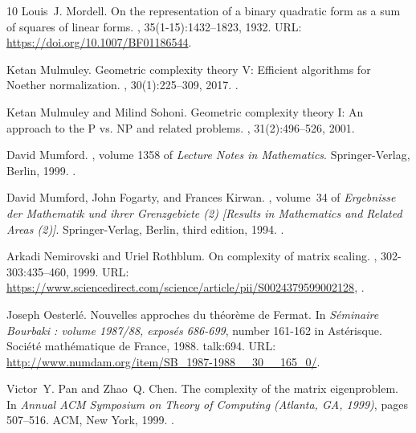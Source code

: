 \documentclass[10pt,a4paper]{article}
\theoremstyle{definition}
\numberwithin{equation}{section}
\begin{document}
\begin{thebibliography}{10}
Louis~J. Mordell.
\newblock On the representation of a binary quadratic form as a sum of squares
  of linear forms.
, 35(1-15):1432--1823, 1932.
\newblock URL: \url{https://doi.org/10.1007/BF01186544}.

Ketan Mulmuley.
\newblock Geometric complexity theory {V}: {E}fficient algorithms for {N}oether
  normalization.
, 30(1):225--309, 2017.
\newblock \href {https://doi.org/10.1090/jams/864}
  {}.

Ketan Mulmuley and Milind Sohoni.
\newblock Geometric complexity theory {I}: An approach to the {P} vs. {NP} and
  related problems.
, 31(2):496--526, 2001.

David Mumford.
, volume 1358 of {\em
  Lecture Notes in Mathematics}.
\newblock Springer-Verlag, Berlin, 1999.
\newblock \href {https://doi.org/10.1007/b62130} {}.

David Mumford, John Fogarty, and Frances Kirwan.
, volume~34 of {\em Ergebnisse der
  Mathematik und ihrer Grenzgebiete (2) [Results in Mathematics and Related
  Areas (2)]}.
\newblock Springer-Verlag, Berlin, third edition, 1994.
\newblock \href {https://doi.org/10.1007/978-3-642-57916-5}
  {}.

Arkadi Nemirovski and Uriel Rothblum.
\newblock On complexity of matrix scaling.
, 302-303:435--460, 1999.
\newblock URL:
  \url{https://www.sciencedirect.com/science/article/pii/S0024379599002128},
  \href {https://doi.org/https://doi.org/10.1016/S0024-3795(99)00212-8}
  {}.

Joseph Oesterl\'e.
\newblock Nouvelles approches du th\'eor\`eme de {Fermat}.
\newblock In {\em S\'eminaire Bourbaki : volume 1987/88, expos\'es 686-699},
  number 161-162 in Ast\'erisque. Soci\'et\'e math\'ematique de France, 1988.
\newblock talk:694.
\newblock URL: \url{http://www.numdam.org/item/SB_1987-1988__30__165_0/}.

Victor~Y. Pan and Zhao~Q. Chen.
\newblock The complexity of the matrix eigenproblem.
\newblock In {\em Annual {ACM} {S}ymposium on {T}heory of {C}omputing
  ({A}tlanta, {GA}, 1999)}, pages 507--516. ACM, New York, 1999.
\newblock \href {https://doi.org/10.1145/301250.301389}
  {}.


\end{thebibliography}
\end{document}
